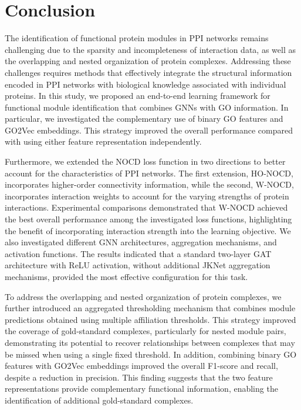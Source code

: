 \section{Conclusion}

The identification of functional protein modules in PPI networks remains challenging due to the sparsity and incompleteness of interaction data, as well as the overlapping and nested organization of protein complexes. Addressing these challenges requires methods that effectively integrate the structural information encoded in PPI networks with biological knowledge associated with individual proteins. In this study, we proposed an end-to-end learning framework for functional module identification that combines GNNs with GO information. In particular, we investigated the complementary use of binary GO features and GO2Vec embeddings. This strategy improved the overall performance compared with using either feature representation independently.

Furthermore, we extended the NOCD loss function in two directions to better account for the characteristics of PPI networks. The first extension, HO-NOCD, incorporates higher-order connectivity information, while the second, W-NOCD, incorporates interaction weights to account for the varying strengths of protein interactions. Experimental comparisons demonstrated that W-NOCD achieved the best overall performance among the investigated loss functions, highlighting the benefit of incorporating interaction strength into the learning objective. We also investigated different GNN architectures, aggregation mechanisms, and activation functions. The results indicated that a standard two-layer GAT architecture with ReLU activation, without additional JKNet aggregation mechanisms, provided the most effective configuration for this task.

To address the overlapping and nested organization of protein complexes, we further introduced an aggregated thresholding mechanism that combines module predictions obtained using multiple affiliation thresholds. This strategy improved the coverage of gold-standard complexes, particularly for nested module pairs, demonstrating its potential to recover relationships between complexes that may be missed when using a single fixed threshold. In addition, combining binary GO features with GO2Vec embeddings improved the overall F1-score and recall, despite a reduction in precision. This finding suggests that the two feature representations provide complementary functional information, enabling the identification of additional gold-standard complexes.


